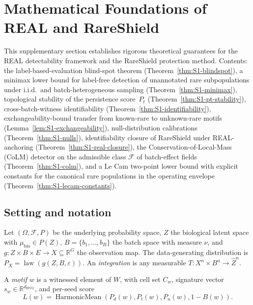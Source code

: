 
\section{Mathematical Foundations of REAL and RareShield}
\label{sec:S1}

This supplementary section establishes rigorous theoretical guarantees for the REAL detectability framework and the RareShield protection method. Contents: the label-based-evaluation blind-spot theorem (Theorem~\ref{thm:S1-blindspot}), a minimax lower bound for label-free detection of unannotated rare subpopulations under i.i.d.\ and batch-heterogeneous sampling (Theorem~\ref{thm:S1-minimax}), topological stability of the persistence score~$P_t$ (Theorem~\ref{thm:S1-pt-stability}), cross-batch-witness identifiability (Theorem~\ref{thm:S1-identifiability}), exchangeability-bound transfer from known-rare to unknown-rare motifs (Lemma~\ref{lem:S1-exchangeability}), null-distribution calibrations (Theorem~\ref{thm:S1-nulls}), identifiability closure of RareShield under REAL-anchoring (Theorem~\ref{thm:S1-real-closure}), the Conservation-of-Local-Mass (CoLM) detector on the admissible class $\mathcal{F}$ of batch-effect fields (Theorem~\ref{thm:S1-colm}), and a Le Cam two-point lower bound with explicit constants for the canonical rare populations in the operating envelope (Theorem~\ref{thm:S1-lecam-constants}).

\subsection{Setting and notation}
\label{sec:S1-setting}

Let $(\Omega, \mathcal{F}, P)$ be the underlying probability space, $Z$ the biological latent space with $\mu_{\text{bio}}\in P(Z)$, $B=\{b_{1},\dots,b_{B}\}$ the batch space with measure $\nu$, and $g:Z\times B\times E\to X\subseteq\mathbb{R}^{G}$ the observation map. The data-generating distribution is $P_{X}=\operatorname{law}(g(Z,B,\varepsilon))$. An \emph{integration} is any measurable $T: X^{n}\times B^{n}\to \widehat{Z}^{n}$.

A \emph{motif} $w$ is a witnessed element of $W$, with cell set $C_{w}$, signature vector $s_{w}\in\mathbb{R}^{d_{\text{HVG}}}$, and per-seed score
\[
  L(w) = \operatorname{HarmonicMean}(P_{d}(w),P_{t}(w),P_{n}(w),1-B(w)).
\]


